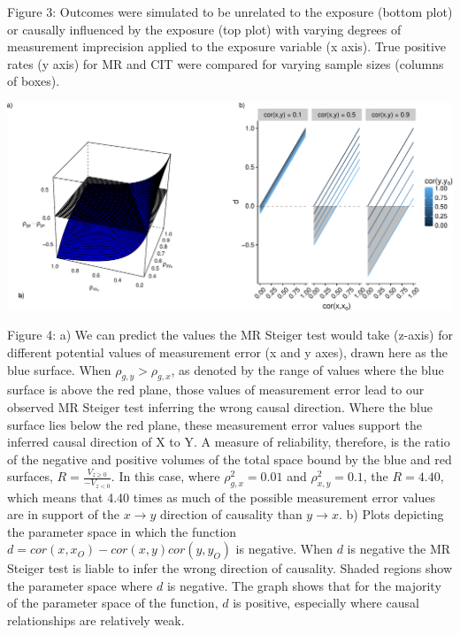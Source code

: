 \documentclass[]{article}
\begin{document}
Figure 3: Outcomes were simulated to be unrelated to the exposure
(bottom plot) or causally influenced by the exposure (top plot) with
varying degrees of measurement imprecision applied to the exposure
variable (x axis). True positive rates (y axis) for MR and CIT were
compared for varying sample sizes (columns of boxes).

\newpage

\includegraphics{manuscript_files/figure-latex/steiger_sensitivity_plot-1.pdf}

Figure 4: a) We can predict the values the MR Steiger test would take
(z-axis) for different potential values of measurement error (x and y
axes), drawn here as the blue surface. When \(\rho_{g,y} > \rho_{g,x}\),
as denoted by the range of values where the blue surface is above the
red plane, those values of measurement error lead to our observed MR
Steiger test inferring the wrong causal direction. Where the blue
surface lies below the red plane, these measurement error values support
the inferred causal direction of X to Y. A measure of reliability,
therefore, is the ratio of the negative and positive volumes of the
total space bound by the blue and red surfaces,
\(R = \frac{V_{z \geq 0}}{ - V_{z < 0} }\). In this case, where
\(\rho_{g,x}^2 = 0.01\) and \(\rho_{x,y}^2 = 0.1\), the \(R = 4.40\),
which means that 4.40 times as much of the possible measurement error
values are in support of the \(x \rightarrow y\) direction of causality
than \(y \rightarrow x\). b) Plots depicting the parameter space in
which the function \(d = cor(x, x_O) - cor(x,y)cor(y, y_O)\) is
negative. When \(d\) is negative the MR Steiger test is liable to infer
the wrong direction of causality. Shaded regions show the parameter
space where \(d\) is negative. The graph shows that for the majority of
the parameter space of the function, \(d\) is positive, especially where
causal relationships are relatively weak.

\newpage
\end{document}

